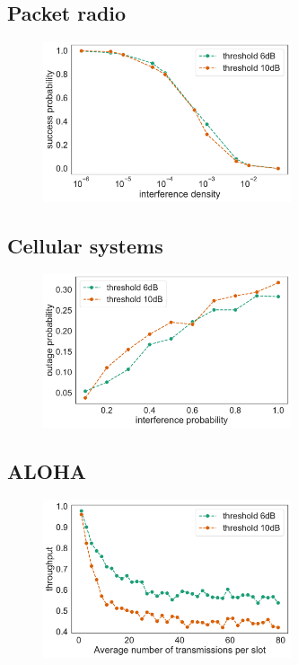 \documentclass[twoside,onecolumn]{article}
\theoremstyle{definition}
\begin{document}
\subsection{Packet radio}
\begin{figure} \centering
         \includegraphics[width=0.65\textwidth]{../SINR_systems/figures/packet_radio.pdf}
    \caption{ }\label{fig:}
\end{figure}

\subsection{Cellular systems}
\begin{figure} \centering
         \includegraphics[width=0.65\textwidth]{../SINR_systems/figures/cellular_system.pdf}
    \caption{ }\label{fig:}
\end{figure}

\subsection{ALOHA}
\begin{figure} \centering
         \includegraphics[width=0.65\textwidth]{../SINR_systems/figures/multi_access.pdf}
    \caption{ }\label{fig:}
\end{figure}
\end{document}
